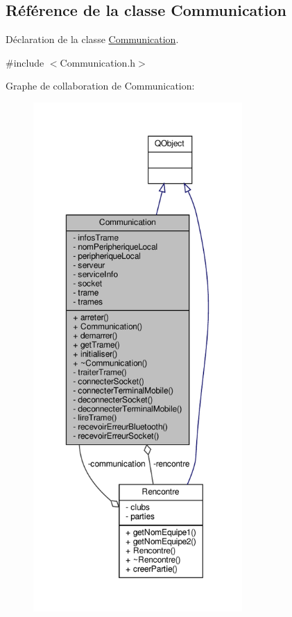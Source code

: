\hypertarget{class_communication}{}\subsection{Référence de la classe Communication}
\label{class_communication}


Déclaration de la classe \hyperlink{class_communication}{Communication}.  




{\ttfamily \#include $<$Communication.\+h$>$}



Graphe de collaboration de Communication\+:
\nopagebreak
\begin{figure}[H]
\begin{center}
\leavevmode
\includegraphics[height=550pt]{class_communication__coll__graph}
\end{center}
\end{figure}
